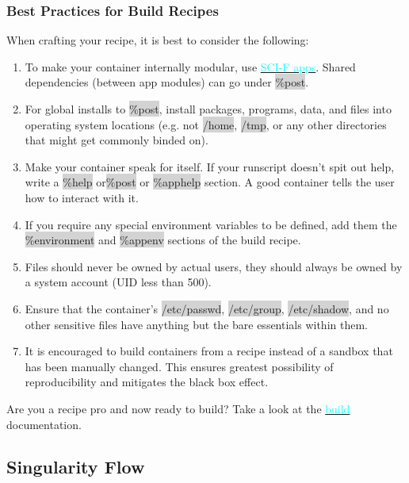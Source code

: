 \documentclass[a4paper]{article}
\begin{document}
\subsubsection{Best Practices for Build Recipes}

When crafting your recipe, it is best to consider the following:

\begin{enumerate}
\item 
To make your container internally modular, use \hyperref[sec:scifapps]{{\textcolor{cyan}{SCI-F apps}}}. Shared dependencies (between app modules) can go under \colorbox{lightgray}{\%post}.
\item
For global installs to \colorbox{lightgray}{\%post}, install packages, programs, data, and files into operating system locations (e.g. not \colorbox{lightgray}{/home}, \colorbox{lightgray}{/tmp}, or any other directories that might get commonly binded on).
\item Make your container speak for itself. If your runscript doesn’t spit out help, write a \colorbox{lightgray}{\%help} or\colorbox{lightgray}{\%post} or \colorbox{lightgray}{\%apphelp} section. A good container tells the user how to interact with it.
\item If you require any special environment variables to be defined, add them the \colorbox{lightgray}{\%environment} and \colorbox{lightgray}{\%appenv} sections of the build recipe.
\item Files should never be owned by actual users, they should always be owned by a system account (UID less than 500).
\item Ensure that the container’s \colorbox{lightgray}{/etc/passwd}, \colorbox{lightgray}{/etc/group}, \colorbox{lightgray}{/etc/shadow}, and no other sensitive files have anything but the bare essentials within them.
\item It is encouraged to build containers from a recipe instead of a sandbox that has been manually changed. This ensures greatest possibility of reproducibility and mitigates the black box effect.
\end{enumerate}

Are you a recipe pro and now ready to build? Take a look at the  \hyperref[sec:buildcontainer]{{\textcolor{cyan}{build}}} documentation.

\subsection{Singularity Flow}
\end{document}
